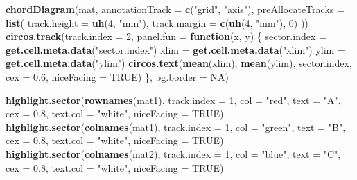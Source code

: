 \documentclass[]{book}
\newenvironment{Shaded}{\begin{snugshade}}{\end{snugshade}}
\newcommand{\KeywordTok}[1]{\textcolor[rgb]{0.13,0.29,0.53}{\textbf{#1}}}
\newcommand{\DataTypeTok}[1]{\textcolor[rgb]{0.13,0.29,0.53}{#1}}
\newcommand{\DecValTok}[1]{\textcolor[rgb]{0.00,0.00,0.81}{#1}}
\newcommand{\FloatTok}[1]{\textcolor[rgb]{0.00,0.00,0.81}{#1}}
\newcommand{\StringTok}[1]{\textcolor[rgb]{0.31,0.60,0.02}{#1}}
\newcommand{\OtherTok}[1]{\textcolor[rgb]{0.56,0.35,0.01}{#1}}
\newcommand{\ControlFlowTok}[1]{\textcolor[rgb]{0.13,0.29,0.53}{\textbf{#1}}}
\newcommand{\NormalTok}[1]{#1}
\begin{document}
\begin{Shaded}
\begin{Highlighting}[]
\KeywordTok{chordDiagram}\NormalTok{(mat, }\DataTypeTok{annotationTrack =} \KeywordTok{c}\NormalTok{(}\StringTok{"grid"}\NormalTok{, }\StringTok{"axis"}\NormalTok{),}
    \DataTypeTok{preAllocateTracks =} \KeywordTok{list}\NormalTok{(}
        \DataTypeTok{track.height =} \KeywordTok{uh}\NormalTok{(}\DecValTok{4}\NormalTok{, }\StringTok{"mm"}\NormalTok{),}
        \DataTypeTok{track.margin =} \KeywordTok{c}\NormalTok{(}\KeywordTok{uh}\NormalTok{(}\DecValTok{4}\NormalTok{, }\StringTok{"mm"}\NormalTok{), }\DecValTok{0}\NormalTok{)}
\NormalTok{))}
\KeywordTok{circos.track}\NormalTok{(}\DataTypeTok{track.index =} \DecValTok{2}\NormalTok{, }\DataTypeTok{panel.fun =} \ControlFlowTok{function}\NormalTok{(x, y) \{}
\NormalTok{    sector.index =}\StringTok{ }\KeywordTok{get.cell.meta.data}\NormalTok{(}\StringTok{"sector.index"}\NormalTok{)}
\NormalTok{    xlim =}\StringTok{ }\KeywordTok{get.cell.meta.data}\NormalTok{(}\StringTok{"xlim"}\NormalTok{)}
\NormalTok{    ylim =}\StringTok{ }\KeywordTok{get.cell.meta.data}\NormalTok{(}\StringTok{"ylim"}\NormalTok{)}
    \KeywordTok{circos.text}\NormalTok{(}\KeywordTok{mean}\NormalTok{(xlim), }\KeywordTok{mean}\NormalTok{(ylim), sector.index, }\DataTypeTok{cex =} \FloatTok{0.6}\NormalTok{, }\DataTypeTok{niceFacing =} \OtherTok{TRUE}\NormalTok{)}
\NormalTok{\}, }\DataTypeTok{bg.border =} \OtherTok{NA}\NormalTok{)}

\KeywordTok{highlight.sector}\NormalTok{(}\KeywordTok{rownames}\NormalTok{(mat1), }\DataTypeTok{track.index =} \DecValTok{1}\NormalTok{, }\DataTypeTok{col =} \StringTok{"red"}\NormalTok{, }
    \DataTypeTok{text =} \StringTok{"A"}\NormalTok{, }\DataTypeTok{cex =} \FloatTok{0.8}\NormalTok{, }\DataTypeTok{text.col =} \StringTok{"white"}\NormalTok{, }\DataTypeTok{niceFacing =} \OtherTok{TRUE}\NormalTok{)}
\KeywordTok{highlight.sector}\NormalTok{(}\KeywordTok{colnames}\NormalTok{(mat1), }\DataTypeTok{track.index =} \DecValTok{1}\NormalTok{, }\DataTypeTok{col =} \StringTok{"green"}\NormalTok{, }
    \DataTypeTok{text =} \StringTok{"B"}\NormalTok{, }\DataTypeTok{cex =} \FloatTok{0.8}\NormalTok{, }\DataTypeTok{text.col =} \StringTok{"white"}\NormalTok{, }\DataTypeTok{niceFacing =} \OtherTok{TRUE}\NormalTok{)}
\KeywordTok{highlight.sector}\NormalTok{(}\KeywordTok{colnames}\NormalTok{(mat2), }\DataTypeTok{track.index =} \DecValTok{1}\NormalTok{, }\DataTypeTok{col =} \StringTok{"blue"}\NormalTok{, }
    \DataTypeTok{text =} \StringTok{"C"}\NormalTok{, }\DataTypeTok{cex =} \FloatTok{0.8}\NormalTok{, }\DataTypeTok{text.col =} \StringTok{"white"}\NormalTok{, }\DataTypeTok{niceFacing =} \OtherTok{TRUE}\NormalTok{)}
\end{Highlighting}
\end{Shaded}
\end{document}
